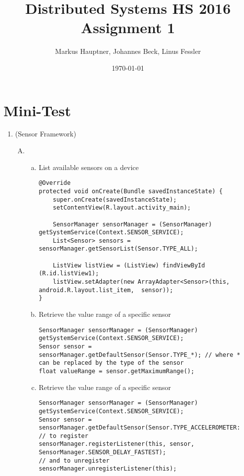 \documentclass[11pt]{article}
\title{Distributed Systems HS 2016\\Assignment 1}
\author{Markus Hauptner, Johannes Beck, Linus Fessler}
\date{\today}
\begin{document}
\maketitle

\section{Mini-Test}

\begin{enumerate}

\item (Sensor Framework)
\begin{enumerate}[A)]

\item 
\begin{enumerate}[a)]

\item List available sensors on a device
\begin{lstlisting}
@Override
protected void onCreate(Bundle savedInstanceState) {
	super.onCreate(savedInstanceState);
	setContentView(R.layout.activity_main);
	
	SensorManager sensorManager = (SensorManager) getSystemService(Context.SENSOR_SERVICE);
	List<Sensor> sensors = sensorManager.getSensorList(Sensor.TYPE_ALL);
	
	ListView listView = (ListView) findViewById (R.id.listView1);
	listView.setAdapter(new ArrayAdapter<Sensor>(this, android.R.layout.list_item,  sensor));
}
\end{lstlisting}

\item Retrieve the value range of a specific sensor
\begin{lstlisting}
SensorManager sensorManager = (SensorManager) getSystemService(Context.SENSOR_SERVICE);
Sensor sensor = sensorManager.getDefaultSensor(Sensor.TYPE_*); // where * can be replaced by the type of the sensor
float valueRange = sensor.getMaximumRange();
\end{lstlisting}

\item Retrieve the value range of a specific sensor
\begin{lstlisting}
SensorManager sensorManager = (SensorManager) getSystemService(Context.SENSOR_SERVICE);
Sensor sensor = sensorManager.getDefaultSensor(Sensor.TYPE_ACCELEROMETER:
// to register
sensorManager.registerListener(this, sensor, SensorManager.SENSOR_DELAY_FASTEST);
// and to unregister
sensorManager.unregisterListener(this);
\end{lstlisting}


\end{enumerate}
\end{enumerate}
\end{enumerate}
\end{document}
